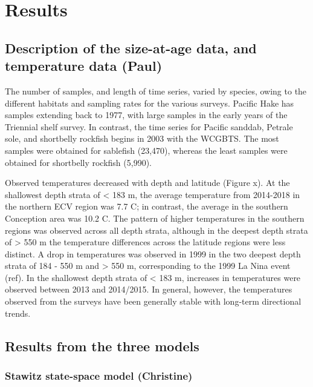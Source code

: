 \documentclass[
]{article}
\begin{document}
\hypertarget{results}{%
\section{Results}\label{results}}

\hypertarget{description-of-the-size-at-age-data-and-temperature-data-paul}{%
\subsection{Description of the size-at-age data, and temperature data
(Paul)}\label{description-of-the-size-at-age-data-and-temperature-data-paul}}

The number of samples, and length of time series, varied by species,
owing to the different habitats and sampling rates for the various
surveys. Pacific Hake has samples extending back to 1977, with large
samples in the early years of the Triennial shelf survey. In contrast,
the time series for Pacific sanddab, Petrale sole, and shortbelly
rockfish begins in 2003 with the WCGBTS. The most samples were obtained
for sablefish (23,470), whereas the least samples were obtained for
shortbelly rockfish (5,990).

Observed temperatures decreased with depth and latitude (Figure x). At
the shallowest depth strata of \textless{} 183 m, the average
temperature from 2014-2018 in the northern ECV region was 7.7 C; in
contrast, the average in the southern Conception area was 10.2 C. The
pattern of higher temperatures in the southern regions was observed
across all depth strata, although in the deepest depth strata of
\textgreater{} 550 m the temperature differences across the latitude
regions were less distinct. A drop in temperatures was observed in 1999
in the two deepest depth strata of 184 - 550 m and \textgreater{} 550 m,
corresponding to the 1999 La Nina event (ref). In the shallowest depth
strata of \textless{} 183 m, increases in temperatures were observed
between 2013 and 2014/2015. In general, however, the temperatures
observed from the surveys have been generally stable with long-term
directional trends.

\hypertarget{results-from-the-three-models}{%
\subsection{Results from the three
models}\label{results-from-the-three-models}}

\hypertarget{stawitz-state-space-model-christine}{%
\subsubsection{Stawitz state-space model
(Christine)}\label{stawitz-state-space-model-christine}}
\end{document}
